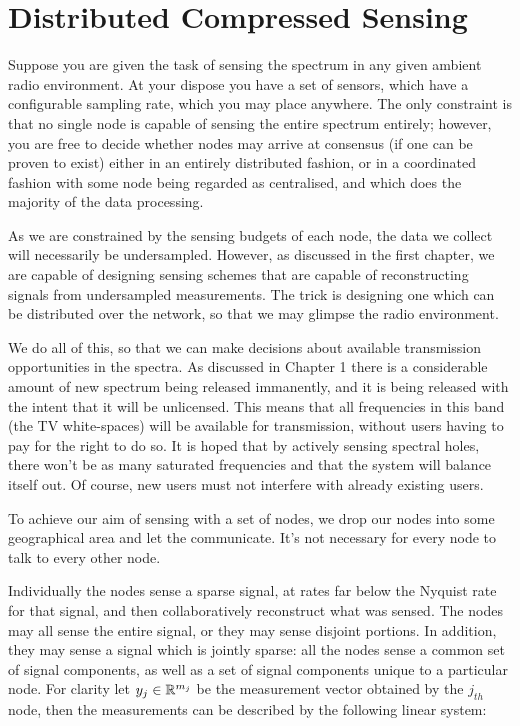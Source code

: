 \section{Distributed Compressed Sensing}
Suppose you are given the task of sensing the spectrum in any given ambient radio environment. At your dispose you have a set of sensors, which have a configurable sampling rate, which you may place anywhere. The only constraint is that no single node is capable of sensing the entire spectrum entirely; however, you are free to decide whether nodes may arrive at consensus (if one can be proven to exist) either in an entirely distributed fashion, or in a coordinated fashion with some node being regarded as centralised, and which does the majority of the data processing.

As we are constrained by the sensing budgets of each node, the data we collect will necessarily be undersampled. However, as discussed in the first chapter, we are capable of designing sensing schemes that are capable of reconstructing signals from undersampled measurements. The trick is designing one which can be distributed over the network, so that we may glimpse the radio environment. 

We do all of this, so that we can make decisions about available transmission opportunities in the spectra. As discussed in Chapter 1 there is a considerable amount of new spectrum being released immanently, and it is being released with the intent that it will be unlicensed. This means that all frequencies in this band (the TV white-spaces) will be available for transmission, without users having to pay for the right to do so. It is hoped that by actively sensing spectral holes, there won't be as many saturated frequencies and that the system will balance itself out. Of course, new users must not interfere with already existing users. 

To achieve our aim of sensing with a set of nodes, we drop our nodes into some geographical area and let the communicate. It's not necessary for every node to talk to every other node. 

Individually the nodes sense a sparse signal, at rates far below the Nyquist rate for that signal, and then collaboratively reconstruct what was sensed. The nodes may all sense the entire signal, or they may sense disjoint portions. In addition, they may sense a signal which is jointly sparse: all the nodes sense a common set of signal components, as well as a set of signal components unique to a particular node. For clarity let \(y_j \in {\mathbb{R}}^{m_j}\) be the measurement vector obtained by the \(j_{th}\) node, then the measurements can be described by the following linear system:

